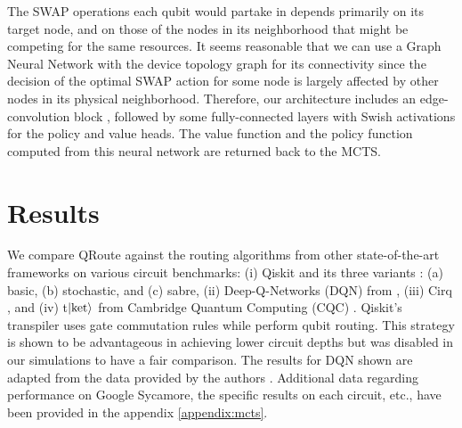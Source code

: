 
The SWAP operations each qubit would partake in depends primarily on its target node, and on those of the nodes in its neighborhood that might be competing for the same resources. It seems reasonable that we can use a Graph Neural Network with the device topology graph for its connectivity since the decision of the optimal SWAP action for some node is largely affected by other nodes in its physical neighborhood. Therefore, our architecture includes an edge-convolution block \cite{nn_edge_conv}, followed by some fully-connected layers with Swish \cite{nn_swish} activations for the policy and value heads. The value function and the policy function computed from this neural network are returned back to the MCTS.



\section{\label{sec:results}Results}
We compare QRoute against the routing algorithms from other state-of-the-art frameworks on various circuit benchmarks: (i) Qiskit and its three variants \cite{comp_qiskit}: (a) basic, (b) stochastic, and (c) sabre, (ii) Deep-Q-Networks (DQN) from \cite{qroute_dqn2}, (iii) Cirq \cite{comp_cirq}, and (iv) t$\ket{\text{ket}}$ from Cambridge Quantum Computing (CQC) \cite{comp_pytket}. 
Qiskit's transpiler uses gate commutation rules while perform qubit routing. This strategy is shown to be advantageous in achieving lower circuit depths \cite{bridge_gate} but was disabled in our simulations to have a fair comparison. The results for DQN shown are adapted from the data provided by the authors \cite{qroute_dqn2}. Additional data regarding performance on Google Sycamore, the specific results on each circuit, etc., have been provided in the appendix \ref{appendix:mcts}.

